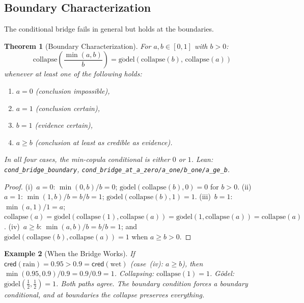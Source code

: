 \documentclass[11pt,a4paper]{article}
\newtheorem{theorem}{Theorem}[section]
\newtheorem{example}[theorem]{Example}
\newcommand{\cred}{\mathsf{cred}}
\begin{document}
\subsection{Boundary Characterization}
\label{sec:boundary}

The conditional bridge fails in general but holds at the boundaries.

\begin{theorem}[Boundary Characterization]
\label{thm:boundary}
For $a, b \in [0,1]$ with $b > 0$:
\[
\mathrm{collapse}\!\left(\frac{\min(a,b)}{b}\right)
= \mathrm{g\ddot{o}del}(\mathrm{collapse}(b),\,
\mathrm{collapse}(a))
\]
whenever at least one of the following holds:
\begin{enumerate}[label=\textup{(\roman*)},nosep]
\item $a = 0$ (conclusion impossible),
\item $a = 1$ (conclusion certain),
\item $b = 1$ (evidence certain),
\item $a \geq b$ (conclusion at least as credible as evidence).
\end{enumerate}
In all four cases, the min-copula conditional is either $0$ or $1$.
Lean: \texttt{cond\_bridge\_boundary},
\texttt{cond\_bridge\_at\_a\_zero/\linebreak a\_one/b\_one/a\_ge\_b}.
\end{theorem}

\begin{proof}
(i)~$a = 0$: $\min(0,b)/b = 0$;
$\mathrm{g\ddot{o}del}(\mathrm{collapse}(b), 0) = 0$ for $b > 0$.
(ii)~$a = 1$: $\min(1,b)/b = b/b = 1$;
$\mathrm{g\ddot{o}del}(\mathrm{collapse}(b), 1) = 1$.
(iii)~$b = 1$: $\min(a,1)/1 = a$;
$\mathrm{collapse}(a) = \mathrm{g\ddot{o}del}(\mathrm{collapse}(1),
\mathrm{collapse}(a)) = \mathrm{g\ddot{o}del}(1, \mathrm{collapse}(a))
= \mathrm{collapse}(a)$.
(iv)~$a \geq b$: $\min(a,b)/b = b/b = 1$; and
$\mathrm{g\ddot{o}del}(\mathrm{collapse}(b),
\mathrm{collapse}(a)) = 1$ when $a \geq b > 0$.
\end{proof}

\begin{example}[When the Bridge Works]
\label{ex:bridge-works}
If $\cred(\text{rain}) = 0.95 > 0.9 = \cred(\text{wet})$
(case~(iv): $a \geq b$), then
$\min(0.95, 0.9)/0.9 = 0.9/0.9 = 1$.
Collapsing: $\mathrm{collapse}(1) = 1$.
G\"odel: $\mathrm{g\ddot{o}del}(\tfrac{1}{2}, \tfrac{1}{2}) = 1$.
Both paths agree.
The boundary condition forces a boundary conditional, and at
boundaries the collapse preserves everything.
\end{example}
\end{document}
